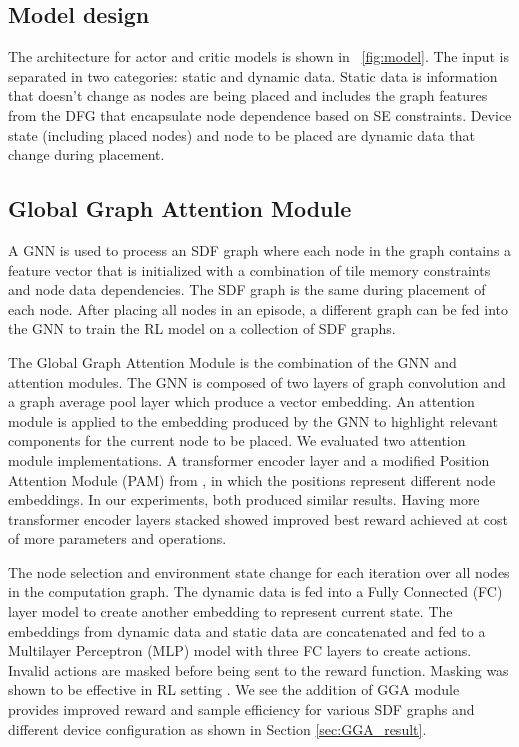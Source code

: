 \subsection{Model design}
The architecture for actor and critic models is shown in \figurename~\ref{fig:model}.
The input is separated in two categories: static and dynamic data. 
Static data is information that doesn't change as nodes are being placed and includes the graph features from the DFG that encapsulate node dependence based on SE constraints.
Device state (including placed nodes) and node to be placed are dynamic data that change during placement.

\subsection{Global Graph Attention Module}

A GNN is used to process an SDF graph where each node in the graph contains a feature vector that is initialized with a combination of tile memory constraints and node data dependencies. 
The SDF graph is the same during placement of each node. 
After placing all nodes in an episode, a different graph can be fed into the GNN to train the RL model on a collection of SDF graphs. 

The Global Graph Attention Module is the combination of the GNN and attention modules.
The GNN is composed of two layers of graph convolution \cite{wu2019simplifying} and a graph average pool layer which produce a vector embedding.
An attention module is applied to the embedding produced by the GNN to highlight relevant components for the current node to be placed. 
We evaluated two attention module implementations. A transformer encoder layer \cite{vaswani2017attention} and a modified Position Attention Module (PAM) from \cite{fu2019dual}, in which the positions represent different node embeddings.
In our experiments, both produced similar results. 
Having more transformer encoder layers stacked showed improved best reward achieved at cost of more parameters and operations.

The node selection and environment state change for each iteration over all nodes in the computation graph. 
The dynamic data is fed into a Fully Connected (FC) layer model to create another embedding to represent current state. 
The embeddings from dynamic data and static data are concatenated and fed to a Multilayer Perceptron (MLP) model with three FC layers to create actions. 
Invalid actions are masked before being sent to the reward function. 
Masking was shown to be effective in RL setting \cite{Shengyi_mask}.
We see the addition of GGA module provides improved reward and sample efficiency for various SDF graphs and different device configuration as shown in Section \ref{sec:GGA_result}.

